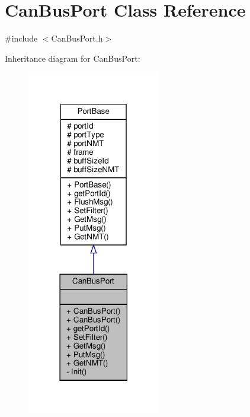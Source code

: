 \hypertarget{classCanBusPort}{}\section{Can\+Bus\+Port Class Reference}
\label{classCanBusPort}


{\ttfamily \#include $<$Can\+Bus\+Port.\+h$>$}



Inheritance diagram for Can\+Bus\+Port\+:\nopagebreak
\begin{figure}[H]
\begin{center}
\leavevmode
\includegraphics[width=165pt]{classCanBusPort__inherit__graph}
\end{center}
\end{figure}


